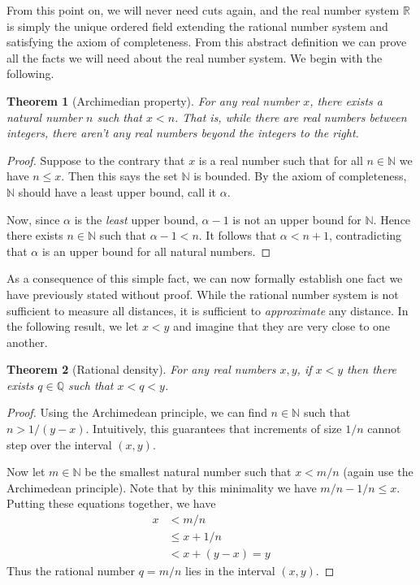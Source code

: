 \documentclass[11pt,oneside]{amsbook}
\newcommand{\N}{\mathbb N}
\newcommand{\Q}{\mathbb Q}
\newcommand{\R}{\mathbb R}
\theoremstyle{definition}
\theoremstyle{plain}
\newtheorem{thm}{Theorem}[section]
\theoremstyle{definition}
\theoremstyle{remark}
\numberwithin{equation}{section}
\numberwithin{figure}{section}
\begin{document}
From this point on, we will never need cuts again, and the real number system $\R$ is simply the unique ordered field extending the rational number system and satisfying the axiom of completeness. From this abstract definition we can prove all the facts we will need about the real number system. We begin with the following.

\begin{thm}[Archimedian property]
  For any real number $x$, there exists a natural number $n$ such that $x<n$. That is, while there are real numbers between integers, there aren't any real numbers beyond the integers to the right.
\end{thm}

\begin{proof}
  Suppose to the contrary that $x$ is a real number such that for all $n\in\N$ we have $n\leq x$. Then this says the set $\N$ is bounded. By the axiom of completeness, $\N$ should have a least upper bound, call it $\alpha$.

  Now, since $\alpha$ is the \emph{least} upper bound, $\alpha-1$ is not an upper bound for $\N$. Hence there exists $n\in\N$ such that $\alpha-1<n$. It follows that $\alpha<n+1$, contradicting that $\alpha$ is an upper bound for all natural numbers.
\end{proof}

As a consequence of this simple fact, we can now formally establish one fact we have previously stated without proof. While the rational number system is not sufficient to measure all distances, it is sufficient to \emph{approximate} any distance. In the following result, we let $x<y$ and imagine that they are very close to one another.

\begin{thm}[Rational density]
  For any real numbers $x,y$, if $x<y$ then there exists $q\in\Q$ such that $x<q<y$.
\end{thm}

\begin{proof}
  Using the Archimedean principle, we can find $n\in\N$ such that $n>1/(y-x)$. Intuitively, this guarantees that increments of size $1/n$ cannot step over the interval $(x,y)$.

  Now let $m\in\N$ be the smallest natural number such that $x<m/n$ (again use the Archimedean principle). Note that by this minimality we have $m/n-1/n\leq x$. Putting these equations together, we have
\begin{align*}
  x&<m/n\\
   &\leq x+1/n\\
   &<x+(y-x)=y
\end{align*}
Thus the rational number $q=m/n$ lies in the interval $(x,y)$.
\end{proof}
\end{document}
